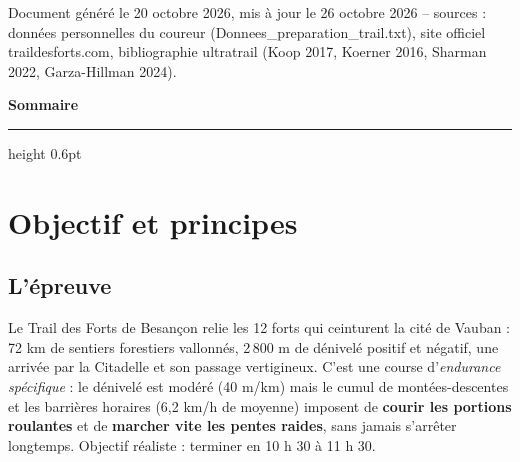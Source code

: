 \documentclass[10pt,a4paper]{article}
\begin{document}
\vfill
\begin{center}\footnotesize\color{grey1}
Document g\'en\'er\'e le 20 octobre 2026, mis \`a jour le 26 octobre 2026 -- sources : donn\'ees personnelles du coureur (Donnees\_preparation\_trail.txt), site officiel traildesforts.com, bibliographie ultratrail (Koop 2017, Koerner 2016, Sharman 2022, Garza-Hillman 2024).
\end{center}
\newpage

\thispagestyle{fancy}
{\sffamily\color{acc}\Large\bfseries Sommaire}
\vspace{6pt}\hrule height 0.6pt\vspace{10pt}
\tableofcontents
\newpage

\section{Objectif et principes}

\subsection{L'\'epreuve}
Le Trail des Forts de Besan\c{c}on relie les 12 forts qui ceinturent la cit\'e
de Vauban : 72 km de sentiers forestiers vallonn\'es, 2\,800 m de d\'enivel\'e
positif et n\'egatif, une arriv\'ee par la Citadelle et son passage vertigineux.
C'est une course d'\emph{endurance sp\'ecifique} : le d\'enivel\'e est mod\'er\'e
(40 m/km) mais le cumul de mont\'ees-descentes et les barri\`eres horaires
(6,2 km/h de moyenne) imposent de \textbf{courir les portions roulantes} et de
\textbf{marcher vite les pentes raides}, sans jamais s'arr\^eter longtemps.
Objectif r\'ealiste : terminer en 10 h 30 \`a 11 h 30.
\end{document}

